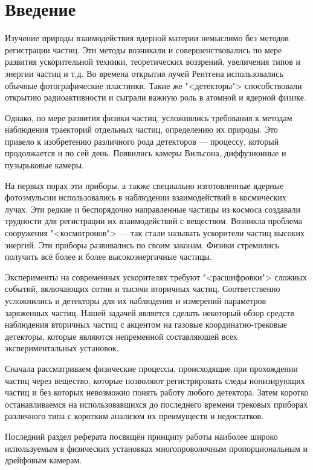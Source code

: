 
\thispagestyle{plain}
\section{Введение}
Изучение природы взаимодействия ядерной материи немыслимо без методов
регистрации частиц. Эти методы возникали и совершенствовались
по мере развития ускорительной техники, теоретических воззрений, увеличения
типов и энергии частиц и т.д. Во времена открытия лучей Рентгена
использовались обычные фотографические пластинки. Такие же "<детекторы">
способствовали открытию радиоактивности и сыграли важную роль в атомной
и ядерной физике.

Однако, по мере развития физики частиц, усложнялись требования к методам
наблюдения траекторий отдельных частиц, определению их природы. Это привело
к изобретению различного рода детекторов --- процессу, который продолжается
и по сей день. Появились камеры Вильсона, диффузионные и пузырьковые
камеры.

На первых порах эти приборы, а также специально изготовленные ядерные
фотоэмульсии использовались в наблюдении взаимодействий в космических лучах.
Эти редкие и беспорядочно направленные частицы из космоса создавали
трудности для регистрации их взаимодействий с веществом. Возникла проблема
сооружения "<космотронов"> --- так стали называть ускорители частиц высоких
энергий. Эти приборы развивались по своим законам. Физики стремились получить
всё более и более высокоэнергичные частицы.

Эксперименты на современных ускорителях требуют "<расшифровки"> сложных
событий, включающих сотни и тысячи вторичных частиц. Соответственно
усложнились и детекторы для их наблюдения и измерений параметров заряженных
частиц. Нашей задачей является сделать некоторый обзор средств наблюдения
вторичных частиц с акцентом на газовые координатно-трековые детекторы,
которые являются непременной составляющей всех экспериментальных установок.

Сначала рассматриваем физические процессы, происходящие при прохождении
частиц через вещество, которые позволяют регистрировать следы ионизирующих
частиц и без которых невозможно понять работу любого детектора. Затем
коротко останавливаемся на использовавшихся до последнего времени трековых
приборах различного типа с коротким анализом их преимуществ и недостатков.

Последний раздел реферата посвящён принципу работы наиболее широко
используемым в физических установках многопроволочным пропорциональным
и дрейфовым камерам.

